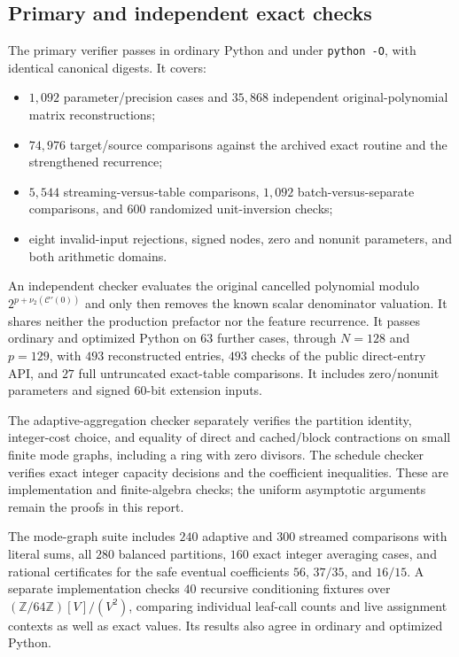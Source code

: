 \documentclass[11pt]{article}
\theoremstyle{definition}\newtheorem{definition}[theorem]{Definition}
\theoremstyle{remark}\newtheorem{remark}[theorem]{Remark}
\newcommand{\vv}{\nu_2}
\begin{document}
\subsection{Primary and independent exact checks}

The primary verifier passes in ordinary Python and under \texttt{python -O},
with identical canonical digests. It covers:
\begin{itemize}
\item $1{,}092$ parameter/precision cases and $35{,}868$ independent
original-polynomial matrix reconstructions;
\item $74{,}976$ target/source comparisons against the archived exact routine
and the strengthened recurrence;
\item $5{,}544$ streaming-versus-table comparisons, $1{,}092$
batch-versus-separate comparisons, and $600$ randomized unit-inversion checks;
\item eight invalid-input rejections, signed nodes, zero and nonunit
parameters, and both arithmetic domains.
\end{itemize}

An independent checker evaluates the original cancelled polynomial modulo
$2^{p+\vv(\mathcal C'(0))}$ and only then removes the known scalar denominator
valuation. It shares neither the production prefactor nor the feature
recurrence. It passes ordinary and optimized Python on $63$ further cases,
through $N=128$ and $p=129$, with $493$ reconstructed entries, $493$ checks of
the public direct-entry API, and $27$ full untruncated exact-table comparisons.
It includes zero/nonunit parameters and signed $60$-bit extension inputs.

The adaptive-aggregation checker separately verifies the partition identity,
integer-cost choice, and equality of direct and cached/block contractions on
small finite mode graphs, including a ring with zero divisors. The schedule
checker verifies exact integer capacity decisions and the coefficient
inequalities. These are implementation and finite-algebra checks; the
uniform asymptotic arguments remain the proofs in this report.

The mode-graph suite includes $240$ adaptive and $300$ streamed comparisons
with literal sums, all $280$ balanced partitions, $160$ exact integer
averaging cases, and rational certificates for the safe eventual coefficients
$56$, $37/35$, and $16/15$. A separate implementation checks $40$ recursive
conditioning fixtures over $(\mathbb Z/64\mathbb Z)[V]/(V^2)$, comparing
individual leaf-call counts and live assignment contexts as well as exact
values. Its results also agree in ordinary and optimized Python.
\end{document}
